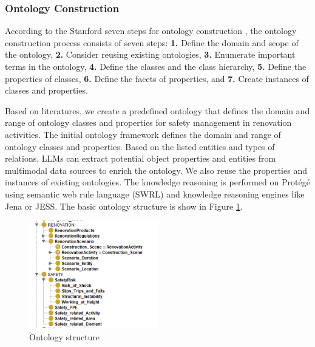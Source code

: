 \subsubsection{Ontology Construction}
According to the Stanford seven steps for ontology construction \cite[]{noy2001ontology}, 
the ontology construction process consists of seven steps: \textbf{1.} Define the domain and scope of the ontology, 
\textbf{2.} Consider reusing existing ontologies, 
\textbf{3.} Enumerate important terms in the ontology, 
\textbf{4.} Define the classes and the class hierarchy, 
\textbf{5.} Define the properties of classes, 
\textbf{6.} Define the facets of properties, and
\textbf{7.} Create instances of classes and properties.

Based on literatures, we create a predefined ontology that defines the domain and range of ontology classes and properties for safety management in renovation activities.
The initial ontology framework defines the domain and range of ontology classes and properties. Based on the listed entities and types of relations,
LLMs can extract potential object properties and entities from multimodal data sources to enrich the ontology. 
We also reuse the properties and instances of existing ontologies. The knowledge reasoning is performed on Protégé using semantic web rule language (SWRL) and knowledge reasoning engines like Jena or JESS.
The basic ontology structure is show in Figure \ref{fig:ontology_structure}.
\begin{figure}[htbp]
    \label{fig:ontology_structure}
    \centering 
    \includegraphics[width=0.5\textwidth]{figures/ontology.png}
    \caption{Ontology structure}
\end{figure}

